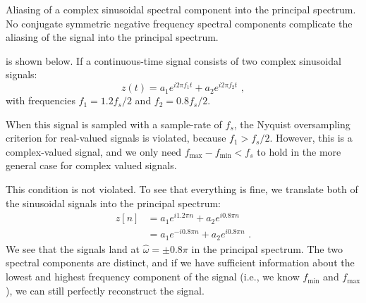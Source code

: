 \begin{marginfigure}
\begin{center}
\end{center}
\caption{Aliasing of a complex sinusoidal spectral component into the principal spectrum. No conjugate symmetric negative frequency spectral components complicate the aliasing of the signal into the principal spectrum.}
\label{fig:complex_aliasing}
\end{marginfigure}

 is shown below. If a continuous-time signal consists of two complex sinusoidal signals:
\begin{equation}
z(t)=a_1 e^{i 2\pi f_1 t} + a_2 e^{i 2\pi f_2 t}\,\,,
\end{equation}
with frequencies $f_1= 1.2 f_s/2$ and $f_2=0.8 f_s/2$.

When this signal is sampled with a sample-rate of $f_s$, the Nyquist oversampling criterion for real-valued signals is violated, because $f_1 > f_s/2$. 
However, this is a complex-valued signal, and we only need $f_{\mathrm{max}} - f_{\mathrm{min}} < f_s$ to hold in the more general case for complex valued signals.

This condition is not violated. To see that everything is fine, we
translate both of the sinusoidal signals into the principal spectrum:
\begin{align}
z[n] &= a_1 e^{i 1.2\pi n }+ a_2 e^{i 0.8\pi n }\\
     &= a_1 e^{-i 0.8\pi n }+ a_2 e^{i 0.8\pi n }\,\,. 
\end{align}
We see that the signals land at $\hat{\omega} = \pm 0.8\pi$ in the
principal spectrum. The two spectral components are distinct, and if we have sufficient information about the lowest and highest frequency component of the signal (i.e., we know $f_{\mathrm{min}}$ and $f_{\mathrm{max}}$), we can still perfectly reconstruct the signal.

